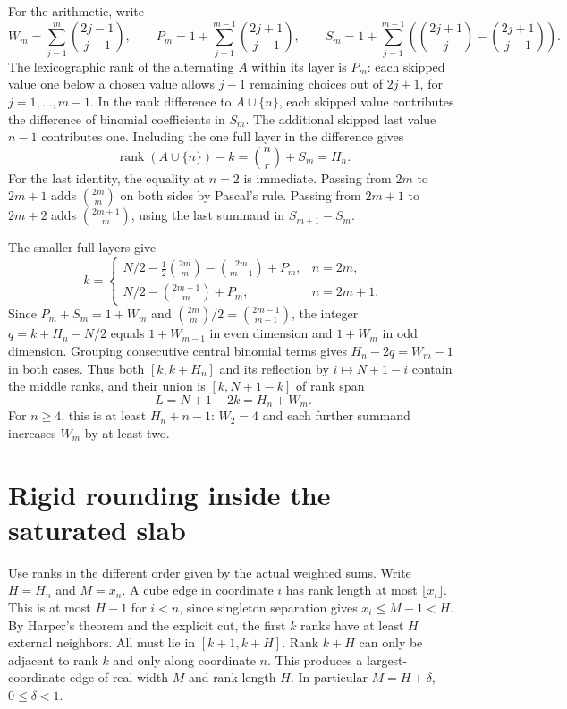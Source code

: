 \documentclass[11pt,letterpaper]{article}
\begin{document}
For the arithmetic, write
\[
 W_m=\sum_{j=1}^{m}\binom{2j-1}{j-1},\qquad
 P_m=1+\sum_{j=1}^{m-1}\binom{2j+1}{j-1},\qquad
 S_m=1+\sum_{j=1}^{m-1}
 \left(\binom{2j+1}{j}-\binom{2j+1}{j-1}\right).
\]
The lexicographic rank of the alternating \(A\) within its layer
is \(P_m\): each skipped value one below a chosen value allows
\(j-1\) remaining choices out of \(2j+1\), for \(j=1,\dots,m-1\).
In the rank difference to \(A\cup\{n\}\), each skipped value
contributes the difference of binomial coefficients in \(S_m\).
The additional skipped last value \(n-1\) contributes one.
Including the one full layer in the difference gives
\[
 \operatorname{rank}(A\cup\{n\})-k=\binom nr+S_m=H_n.
\]
For the last identity, the equality at \(n=2\) is immediate.
Passing from \(2m\) to \(2m+1\) adds \(\binom{2m}{m}\) on
both sides by Pascal's rule. Passing from \(2m+1\) to \(2m+2\)
adds \(\binom{2m+1}{m}\), using the last summand
in \(S_{m+1}-S_m\).

The smaller full layers give
\[
 k=\begin{cases}
 N/2-\tfrac12\binom{2m}{m}-\binom{2m}{m-1}+P_m,& n=2m,\\
 N/2-\binom{2m+1}{m}+P_m,& n=2m+1.
 \end{cases}
\]
Since \(P_m+S_m=1+W_m\) and
\(\binom{2m}{m}/2=\binom{2m-1}{m-1}\), the integer
\(q=k+H_n-N/2\) equals \(1+W_{m-1}\) in even dimension and
\(1+W_m\) in odd dimension. Grouping consecutive central binomial
terms gives \(H_n-2q=W_m-1\) in both cases. Thus both
\([k,k+H_n]\) and its reflection by \(i\mapsto N+1-i\)
contain the middle ranks, and their union is \([k,N+1-k]\)
of rank span
\[
 L=N+1-2k=H_n+W_m.
\]
For \(n\ge4\), this is at least \(H_n+n-1\): \(W_2=4\) and
each further summand increases \(W_m\) by at least two.

\section{Rigid rounding inside the saturated slab}
Use ranks in the different order given by the actual weighted sums.
Write \(H=H_n\) and \(M=x_n\). A cube edge in coordinate \(i\)
has rank length at most \(\lfloor x_i\rfloor\). This is at most
\(H-1\) for \(i<n\), since singleton separation gives
\(x_i\le M-1<H\). By Harper's theorem and the explicit cut,
the first \(k\) ranks have at least \(H\) external neighbors.
All must lie in \([k+1,k+H]\). Rank \(k+H\) can only be
adjacent to rank \(k\) and only along coordinate \(n\). This
produces a largest-coordinate edge of real width \(M\) and
rank length \(H\). In particular \(M=H+\delta\), \(0\le\delta<1\).
\end{document}
